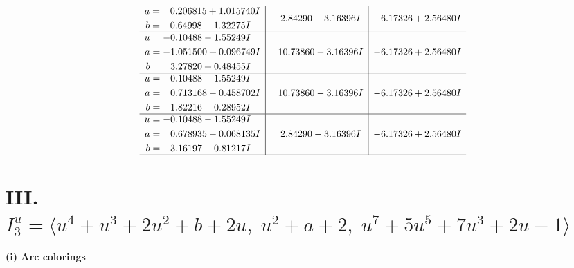 \documentclass[1p]{elsarticle_modified}
\theoremstyle{definition}
\begin{document}
$$\begin{array}{c|c|c}
\begin{aligned}
a &= \phantom{-}0.206815 + 1.015740 I \\
b &= -0.64998 - 1.32275 I\end{aligned}
 & \phantom{-}2.84290 - 3.16396 I & -6.17326 + 2.56480 I \\ \hline\begin{aligned}
u &= -0.10488 - 1.55249 I \\
a &= -1.051500 + 0.096749 I \\
b &= \phantom{-}3.27820 + 0.48455 I\end{aligned}
 & \phantom{-}10.73860 - 3.16396 I & -6.17326 + 2.56480 I \\ \hline\begin{aligned}
u &= -0.10488 - 1.55249 I \\
a &= \phantom{-}0.713168 - 0.458702 I \\
b &= -1.82216 - 0.28952 I\end{aligned}
 & \phantom{-}10.73860 - 3.16396 I & -6.17326 + 2.56480 I \\ \hline\begin{aligned}
u &= -0.10488 - 1.55249 I \\
a &= \phantom{-}0.678935 - 0.068135 I \\
b &= -3.16197 + 0.81217 I\end{aligned}
 & \phantom{-}2.84290 - 3.16396 I & -6.17326 + 2.56480 I\\
 \hline 
 \end{array}$$\newpage\newpage\renewcommand{\arraystretch}{1}
\centering \section*{III. $I^u_{3}= \langle u^4+u^3+2 u^2+b+2 u,\;u^2+a+2,\;u^7+5 u^5+7 u^3+2 u-1 \rangle$}
\flushleft \textbf{(i) Arc colorings}\\
\end{document}
